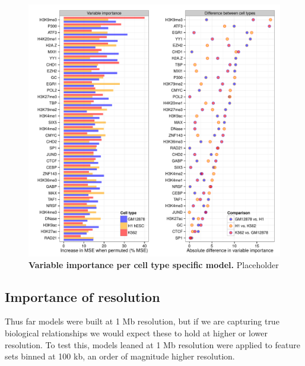 \documentclass[a4paper,11pt,oneside]{book}
\begin{document}
\begin{figure}
\begin{center} 
\includegraphics[width=\textwidth]{figs/varimp_diff.pdf}
\captionsetup{width=\textwidth} 
\caption{ {\bf Variable importance per cell type specific model. }
Placeholder
}\label{fig:varimp_diff}
\end{center} 
\end{figure} 


\subsection{Importance of resolution}

Thus far models were built at 1 Mb resolution, but if we are capturing true biological relationships we would expect these to hold at higher or lower resolution. To test this, models leaned at 1 Mb resolution were applied to feature sets binned at 100 kb, an order of magnitude higher resolution.
\end{document}
